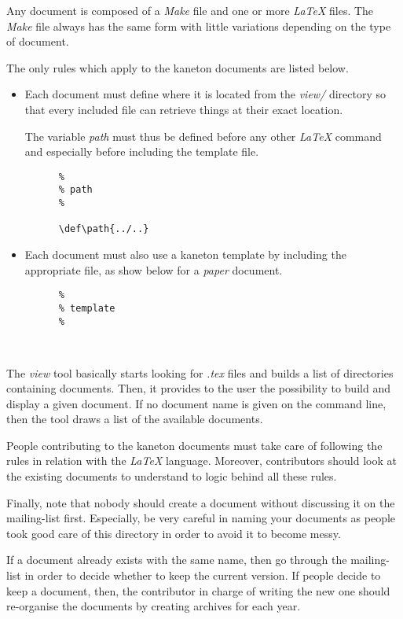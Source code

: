 Any document is composed of a \textit{Make} file and one or more
\textit{\LaTeX} files. The \textit{Make} file always has the same form
with little variations depending on the type of document.

The only rules which apply to the kaneton documents are listed below.

\begin{itemize}
  \item
    Each document must define where it is located from the \textit{view/}
    directory so that every included file can retrieve things at their exact
    location.

    The variable \textit{path} must thus be defined before any other
    \textit{\LaTeX} command and especially before including the template
    file.

    \begin{verbatim}
      %
      % path
      %

      \def\path{../..}
    \end{verbatim}
  \item
    Each document must also use a kaneton template by including the
    appropriate file, as show below for a \textit{paper} document.

    \begin{verbatim}
      %
      % template
      %

      
    \end{verbatim}
\end{itemize}

The \textit{view} tool basically starts looking for \textit{.tex} files
and builds a list of directories containing documents. Then, it provides
to the user the possibility to build and display a given document. If no
document name is given on the command line, then the tool draws a list
of the available documents.

People contributing to the kaneton documents must take care of following
the rules in relation with the \textit{\LaTeX} language. Moreover, contributors
should look at the existing documents to understand to logic behind all
these rules.

Finally, note that nobody should create a document without discussing it
on the mailing-list first. Especially, be very careful in naming your
documents as people took good care of this directory in order to avoid
it to become messy.

If a document already exists with the same name, then go through the
mailing-list in order to decide whether to keep the current version. If
people decide to keep a document, then, the contributor in charge of writing
the new one should re-organise the documents by creating archives for
each year.
